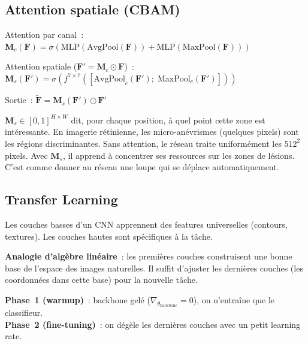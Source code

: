 \documentclass[11pt,a4paper]{article}
\begin{document}
\subsection{Attention spatiale (CBAM)}

Attention par canal~:
$\mathbf{M}_c(\mathbf{F}) = \sigma\!\left(\text{MLP}(\text{AvgPool}(\mathbf{F})) + \text{MLP}(\text{MaxPool}(\mathbf{F}))\right)$

Attention spatiale ($\mathbf{F}' = \mathbf{M}_c \odot \mathbf{F}$)~:
$\mathbf{M}_s(\mathbf{F}') = \sigma\!\left(f^{7 \times 7}([\text{AvgPool}_c(\mathbf{F}');\;\text{MaxPool}_c(\mathbf{F}')])\right)$

Sortie~: $\boxed{\widetilde{\mathbf{F}} = \mathbf{M}_s(\mathbf{F}') \odot \mathbf{F}'}$

\begin{intubox}
$\mathbf{M}_s \in [0,1]^{H \times W}$ dit, pour chaque position, \og{}\`a quel point cette zone est int\'eressante\fg{}. En imagerie r\'etinienne, les micro-an\'evrismes (quelques pixels) sont les r\'egions discriminantes. Sans attention, le r\'eseau traite uniform\'ement les $512^2$ pixels. Avec $\mathbf{M}_s$, il apprend \`a concentrer ses ressources sur les zones de l\'esions. C'est comme donner au r\'eseau une loupe qui se d\'eplace automatiquement.
\end{intubox}

\subsection{Transfer Learning}

\begin{intubox}
Les couches basses d'un CNN apprennent des features universelles (contours, textures). Les couches hautes sont sp\'ecifiques \`a la t\^ache.

\textbf{Analogie d'alg\`ebre lin\'eaire}~: les premi\`eres couches construisent une \og{}bonne base\fg{} de l'espace des images naturelles. Il suffit d'ajuster les derni\`eres couches (les coordonn\'ees dans cette base) pour la nouvelle t\^ache.

\textbf{Phase~1 (warmup)}~: backbone gel\'e ($\nabla_{\theta_{\text{backbone}}} = 0$), on n'entra\^ine que le classifieur.\\
\textbf{Phase~2 (fine-tuning)}~: on d\'eg\`ele les derni\`eres couches avec un petit learning rate.
\end{intubox}
\end{document}
